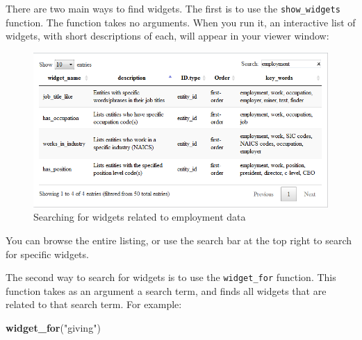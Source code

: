 \documentclass[]{book}
\newenvironment{Shaded}{\begin{snugshade}}{\end{snugshade}}
\newcommand{\KeywordTok}[1]{\textcolor[rgb]{0.13,0.29,0.53}{\textbf{#1}}}
\newcommand{\NormalTok}[1]{#1}
\newcommand{\StringTok}[1]{\textcolor[rgb]{0.31,0.60,0.02}{#1}}
\begin{document}
There are two main ways to find widgets. The first is to use the \texttt{show\_widgets} function. The function takes no arguments. When you run it, an interactive list of widgets, with short descriptions of each, will appear in your viewer window:

\begin{figure}
\centering
\includegraphics{images/show-widgets-employment.png}
\caption{Searching for widgets related to employment data}
\end{figure}

You can browse the entire listing, or use the search bar at the top right to search for specific widgets.

The second way to search for widgets is to use the \texttt{widget\_for} function. This function takes as an argument a search term, and finds all widgets that are related to that search term. For example:

\begin{Shaded}
\begin{Highlighting}[]
\KeywordTok{widget_for}\NormalTok{(}\StringTok{"giving"}\NormalTok{)}
\end{Highlighting}
\end{Shaded}
\end{document}
